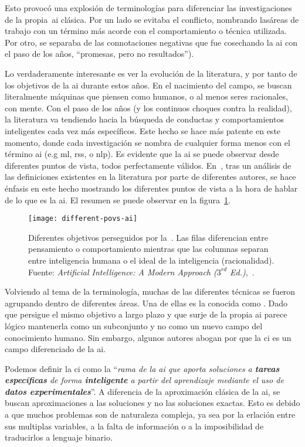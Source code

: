 Esto provocó una explosión de terminologías para diferenciar las investigaciones de la propia~\ac{ai} clásica. Por un lado se evitaba el conflicto, nombrando lasáreas de trabajo con un término más acorde con el comportamiento o técnica utilizada. Por otro, se separaba de las connotaciones negativas que fue cosechando la \ac{ai} con el paso de los años, \enquote{promesas, pero no resultados}).

Lo verdaderamente interesante es ver la evolución de la literatura, y por tanto de los objetivos de la \ac{ai} durante estos años. En el nacimiento del campo, se buscan literalmente máquinas que piensen como humanos, o al menos seres racionales, con mente. Con el paso de los años (y los continuos choques contra la realidad), la literatura va tendiendo hacia la búsqueda de conductas y comportamientos inteligentes cada vez más específicos. Este hecho se hace más patente en este momento, donde cada investigación se nombra de cualquier forma menos con el término \ac{ai} (e.g \ac{ml}, \acp{rs}, o \ac{nlp}). Es evidente que la \ac{ai} se puede observar desde diferentes puntos de vista, todos perfectamente válidos. En~\cite{russell2003artificial}, tras un análisis de las definiciones existentes en la literatura por parte de diferentes autores, se hace énfasis en este hecho mostrando los diferentes puntos de vista a la hora de hablar de lo que es la \ac{ai}. El resumen se puede observar en la figura~\ref{fig:different-povs-ai}.

\begin{figure}
	\texttt{[image: different-povs-ai]}
	\caption{Diferentes objetivos perseguidos por la~. Las filas diferencian entre pensamiento o comportamiento mientras que las columnas separan entre inteligencia humana o el ideal de la inteligencia (racionalidad). Fuente: \textit{Artificial Intelligence: A Modern Approach ($3^{rd}$ Ed.)},~\cite{russell2003artificial}.}
	\label{fig:different-povs-ai}
\end{figure}

Volviendo al tema de la terminología, muchas de las diferentes técnicas se fueron agrupando dentro de diferentes áreas. Una de ellas es la conocida como . Dado que persigue el mismo objetivo a largo plazo y que surje de la propia \ac{ai} parece lógico mantenerla como un subconjunto y no como un nuevo campo del conocimiento humano. Sin embargo, algunos autores abogan por que la \ac{ci} es un campo diferenciado de la \ac{ai}.

Podemos definir la \ac{ci} como la \enquote{\textit{rama de la \ac{ai} que aporta soluciones a \textbf{tareas específicas} de forma \textbf{inteligente} a partir del aprendizaje mediante el uso de \textbf{datos experimentales}}}. A diferencia de la aproximación clásica de la \ac{ai}, se buscan aproximaciones a las soluciones y no las soluciones exactas. Esto es debido a que muchos problemas son de naturaleza compleja, ya sea por la erlación entre sus multiplas variables, a la falta de información o a la imposibilidad de traducirlos a lenguaje binario.

